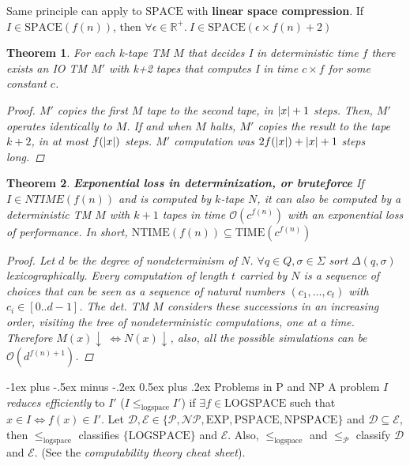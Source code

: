 \documentclass[10pt,landscape]{article}
\makeatletter
\newcommand{\conv}{\downarrow}
\newcommand{\R}{\mathbb{R}}
\renewcommand{\O}{\mathcal{O}}
\newcommand{\D}{\mathcal{D}}
\newcommand{\E}{\mathcal{E}}
\renewcommand{\P}{\mathcal{P}}
\newcommand{\NP}{\mathcal{NP}}
\newcommand{\LOGSPACE}{\mathrm{LOGSPACE}}
\newcommand{\SPACE}{\mathrm{SPACE}}
\newcommand{\PSPACE}{\mathrm{PSPACE}}
\newcommand{\NPSPACE}{\mathrm{NPSPACE}}
\newcommand{\EXP}{\mathrm{EXP}}
\newcommand{\TIME}{\mathrm{TIME}}
\newcommand{\NTIME}{\mathrm{NTIME}}
\DeclarePairedDelimiter\abs{\lvert}{\rvert}
\newcommand{\red}[1]{\leqslant_{#1}}
\renewcommand{\iff}{\Leftrightarrow}
\theoremstyle{plain}%
\newtheorem*{thm}{Theorem}
\theoremstyle{definition}
\theoremstyle{remark}
\renewcommand{\section}{\@startsection{section}{1}{0mm}%
                                {-1ex plus -.5ex minus -.2ex}%
                                {0.5ex plus .2ex}%
                                {\normalfont\large\bfseries}}
\makeatother
\begin{document}
\begin{multicols}{4}
Same principle can apply to $\SPACE$ with \textbf{linear space compression}.
If $I \in \SPACE(f(n))$, then $\forall \epsilon \in \R^+  . \ I \in \SPACE(\epsilon \times f(n) + 2)$ 

\begin{thm}
    For each k-tape TM $M$ that decides I in deterministic time $f$ there exists
    an IO TM $M'$ with k+2 tapes that computes I in time $c \times f$ for some constant $c$.  

    \begin{proof}
        $M'$ copies the first $M$ tape to the second tape, in $\abs{x} + 1$ steps.
        Then, $M'$ operates identically to $M$. If and when $M$ halts,
        $M'$ copies the result to the tape $k+2$, in at most $f(\abs{x})$ steps.
        $M'$ computation was $2f(\abs{x}) + \abs{x} + 1$ steps long. 
    \end{proof}
\end{thm}


\begin{thm} \textbf{Exponential loss in determinization, or bruteforce}
    If $I \in NTIME(f(n))$ and is computed by $k$-tape $N$, it can also be computed by a deterministic 
    TM $M$ with $k+1$ tapes in
    time $\O(c^{f(n)})$ with 
    an exponential loss of performance. In short, $\NTIME(f(n)) \subseteq \TIME(c^{f(n)})$ 

    \begin{proof}
        Let $d$ be the degree of nondeterminism of $N$. 
        $\forall q \in Q, \sigma \in \Sigma$ sort $\Delta(q,\sigma)$ lexicographically.
        Every computation of length $t$ carried by $N$ is a sequence of choices that can
        be seen as a sequence of natural numbers $(c_1, \hdots, c_t)$ with $c_i \in [0..d-1]$.
        The det. TM $M$ considers these successions in an increasing order, visiting
        the tree of nondeterministic computations, one at a time.
        Therefore $M(x)\conv \ \iff N(x)\conv$, also, all the possible simulations
        can be $\O(d^{f(n) + 1})$.
    \end{proof}
\end{thm}

\section{Problems in P and NP}
A problem $I$ \textit{reduces efficiently} to $I'$ ($I \red{\text{logspace}} I'$) if
$\exists f \in \LOGSPACE$ such that $x \in I \iff f(x) \in I'$.
Let $\D, \E \in \{\P, \NP, \EXP, \PSPACE, \NPSPACE\}$ and $\D \subseteq \E$, then
$\red{\text{logspace}}$ classifies $\{\LOGSPACE\}$ and $\E$.
Also, $\red{\text{logspace}}$ and $\red{\P}$ classify $\D$ and $\E$. (See the 
\textit{computability theory cheat sheet}).



\end{multicols}
\end{document}
